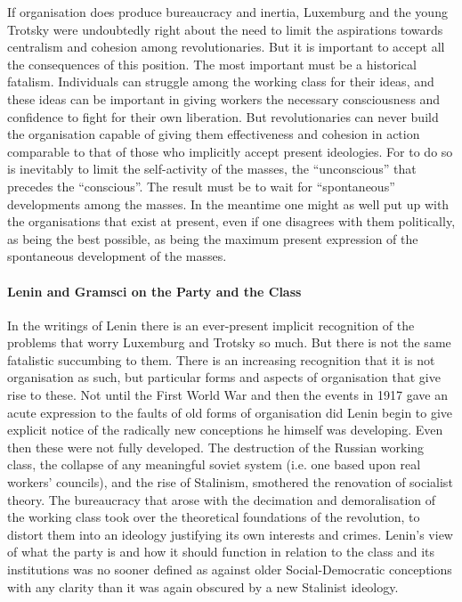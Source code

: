 If organisation does produce bureaucracy and inertia, Luxemburg and the young Trotsky were undoubtedly right about the need to limit the aspirations towards centralism and cohesion among revolutionaries. But it is important to accept all the consequences of this position. The most important must be a historical fatalism. Individuals can struggle among the working class for their ideas, and these ideas can be important in giving workers the necessary consciousness and confidence to fight for their own liberation. But revolutionaries can never build the organisation capable of giving them effectiveness and cohesion in action comparable to that of those who implicitly accept present ideologies. For to do so is inevitably to limit the self-activity of the masses, the ``unconscious'' that precedes the ``conscious''. The result must be to wait for ``spontaneous'' developments among the masses. In the meantime one might as well put up with the organisations that exist at present, even if one disagrees with them politically, as being the best possible, as being the maximum present expression of the spontaneous development of the masses.

\paragraph{Lenin and Gramsci on the Party and the Class}

In the writings of Lenin there is an ever-present implicit recognition of the problems that worry Luxemburg and Trotsky so much. But there is not the same fatalistic succumbing to them. There is an increasing recognition that it is not organisation as such, but particular forms and aspects of organisation that give rise to these. Not until the First World War and then the events in 1917 gave an acute expression to the faults of old forms of organisation did Lenin begin to give explicit notice of the radically new conceptions he himself was developing. Even then these were not fully developed. The destruction of the Russian working class, the collapse of any meaningful soviet system (i.e. one based upon real workers' councils), and the rise of Stalinism, smothered the renovation of socialist theory. The bureaucracy that arose with the decimation and demoralisation of the working class took over the theoretical foundations of the revolution, to distort them into an ideology justifying its own interests and crimes. Lenin's view of what the party is and how it should function in relation to the class and its institutions was no sooner defined as against older Social-Democratic conceptions with any clarity than it was again obscured by a new Stalinist ideology.

